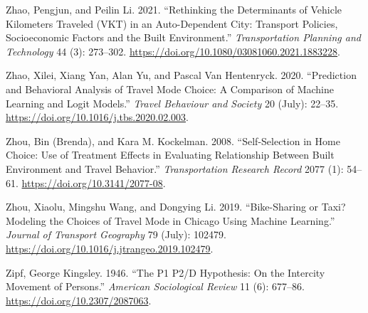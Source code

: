 \documentclass[
  11pt,
  openany]{memoir}
\newlength{\cslhangindent}
\newlength{\cslentryspacingunit} %
\newenvironment{CSLReferences}[2] %
 {%
  \setlength{\parindent}{0pt}
  \ifodd #1
  \let\oldpar\par
  \def\par{\hangindent=\cslhangindent\oldpar}
  \fi
  \setlength{\parskip}{#2\cslentryspacingunit}
 }%
 {}
\begin{document}
\begin{CSLReferences}{1}{0}
\leavevmode{}%
Zhao, Pengjun, and Peilin Li. 2021. {``Rethinking the Determinants of Vehicle Kilometers Traveled ({VKT}) in an Auto-Dependent City: Transport Policies, Socioeconomic Factors and the Built Environment.''} \emph{Transportation Planning and Technology} 44 (3): 273--302. \url{https://doi.org/10.1080/03081060.2021.1883228}.

\leavevmode{}%
Zhao, Xilei, Xiang Yan, Alan Yu, and Pascal Van Hentenryck. 2020. {``Prediction and Behavioral Analysis of Travel Mode Choice: A Comparison of Machine Learning and Logit Models.''} \emph{Travel Behaviour and Society} 20 (July): 22--35. \url{https://doi.org/10.1016/j.tbs.2020.02.003}.

\leavevmode{}%
Zhou, Bin (Brenda), and Kara M. Kockelman. 2008. {``Self-{Selection} in {Home Choice}: Use of {Treatment Effects} in {Evaluating Relationship Between Built Environment} and {Travel Behavior}.''} \emph{Transportation Research Record} 2077 (1): 54--61. \url{https://doi.org/10.3141/2077-08}.

\leavevmode{}%
Zhou, Xiaolu, Mingshu Wang, and Dongying Li. 2019. {``Bike-Sharing or Taxi? Modeling the Choices of Travel Mode in {Chicago} Using Machine Learning.''} \emph{Journal of Transport Geography} 79 (July): 102479. \url{https://doi.org/10.1016/j.jtrangeo.2019.102479}.

\leavevmode{}%
Zipf, George Kingsley. 1946. {``The {P1 P2}/{D Hypothesis}: On the {Intercity Movement} of {Persons}.''} \emph{American Sociological Review} 11 (6): 677--86. \url{https://doi.org/10.2307/2087063}.

\end{CSLReferences}
\end{document}
